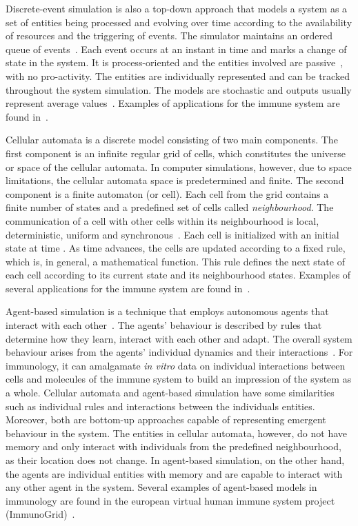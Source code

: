 \documentclass{llncs}
\begin{document}
Discrete-event simulation is also a top-down approach that models a system as a set of entities being processed and evolving over time according to the availability of resources and the triggering of events. The simulator maintains an ordered queue of events~\cite{Siebers:2007}. Each event occurs at an instant in time and marks a change of state in the system. It is process-oriented and the entities involved are passive~\cite{Robinson:2004}, with no pro-activity. The entities are individually represented and can be tracked throughout the system simulation. The models are stochastic and outputs usually represent average values~\cite{Robinson:2009}. Examples of applications for the immune system are found in~\cite{Look:1981,Zand:2004,Figge:2005}.

Cellular automata is a discrete model consisting of two main components. The first component is an infinite regular grid of cells, which constitutes the universe or space of the cellular automata. In computer simulations, however, due to space limitations, the cellular automata space is predetermined and finite. The second component is a finite automaton (or cell). Each cell from the grid contains a finite number of states and a predefined set of cells called {\it neighbourhood}. The communication of a cell with other cells within its neighbourhood is local, deterministic, uniform and synchronous~\cite{WOLFRAM:1983}. Each cell is initialized with an initial state at time . As time advances, the cells are updated according to a fixed rule, which is, in general, a mathematical function. This rule defines the next state of each cell according to its current state and its neighbourhood states. Examples of several applications for the immune system are found in~\cite{Nuno:2007}.

Agent-based simulation is a technique that employs autonomous agents that interact with each other~\cite{Macal:2005}. The agents' behaviour is described by rules that determine how they learn, interact with each other and adapt. The overall system behaviour arises from the agents' individual dynamics and their interactions~\cite{Siebers:2007}. For immunology, it can amalgamate {\it in vitro} data on individual interactions between cells and molecules of the immune system to build an impression of the system as a whole. Cellular automata and agent-based simulation have some similarities such as individual rules and interactions between the individuals entities. Moreover, both are bottom-up approaches capable of representing emergent behaviour in the system. The entities in cellular automata, however, do not have memory and only interact with individuals from the predefined neighbourhood, as their location does not change. In agent-based simulation, on the other hand, the agents are individual entities with memory and are capable to interact with any other agent in the system. Several examples of agent-based models in immunology are found in the european virtual human immune system project (ImmunoGrid)~\cite{ImmunoGrid}.
\end{document}
